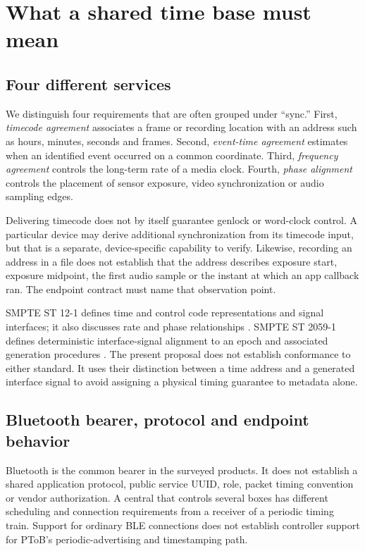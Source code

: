 \documentclass[11pt,letterpaper]{article}
\begin{document}
\section{What a shared time base must mean}
\subsection{Four different services}
We distinguish four requirements that are often grouped under ``sync.'' First, \emph{timecode agreement} associates a frame or recording location with an address such as hours, minutes, seconds and frames. Second, \emph{event-time agreement} estimates when an identified event occurred on a common coordinate. Third, \emph{frequency agreement} controls the long-term rate of a media clock. Fourth, \emph{phase alignment} controls the placement of sensor exposure, video synchronization or audio sampling edges.

Delivering timecode does not by itself guarantee genlock or word-clock control. A particular device may derive additional synchronization from its timecode input, but that is a separate, device-specific capability to verify. Likewise, recording an address in a file does not establish that the address describes exposure start, exposure midpoint, the first audio sample or the instant at which an app callback ran. The endpoint contract must name that observation point.

SMPTE ST 12-1 defines time and control code representations and signal interfaces; it also discusses rate and phase relationships \cite{st12}. SMPTE ST 2059-1 defines deterministic interface-signal alignment to an epoch and associated generation procedures \cite{st2059}. The present proposal does not establish conformance to either standard. It uses their distinction between a time address and a generated interface signal to avoid assigning a physical timing guarantee to metadata alone.

\subsection{Bluetooth bearer, protocol and endpoint behavior}
Bluetooth is the common bearer in the surveyed products. It does not establish a shared application protocol, public service UUID, role, packet timing convention or vendor authorization. A central that controls several boxes has different scheduling and connection requirements from a receiver of a periodic timing train. Support for ordinary BLE connections does not establish controller support for PToB's periodic-advertising and timestamping path.
\end{document}
